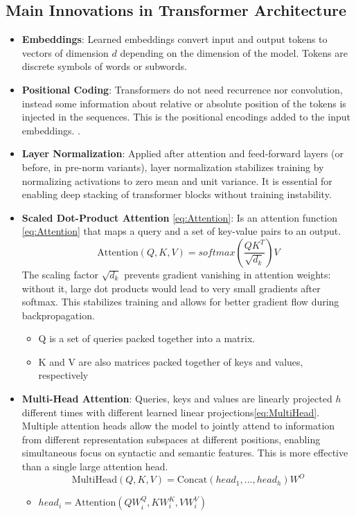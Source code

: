 \subsection{Main Innovations in Transformer Architecture}  
\begin{itemize}
    \item \textbf{Embeddings}: Learned embeddings convert input and output tokens to vectors of dimension $d$ depending on the dimension of the model. Tokens are discrete symbols of words or subwords.
    
    \item \textbf{Positional Coding}:  
    Transformers do not need recurrence nor convolution, instead some information about relative or absolute position of the tokens is injected in the sequences. This is the positional encodings added to the input embeddings. \cite{vaswani2017attention}.
    
    \item \textbf{Layer Normalization}: Applied after attention and feed-forward layers (or before, in pre-norm variants), layer normalization stabilizes training by normalizing activations to zero mean and unit variance. It is essential for enabling deep stacking of transformer blocks without training instability.  
    \item  \textbf{Scaled Dot-Product Attention} \ref{eq:Attention}: Is an attention function \ref{eq:Attention} that maps a query and a set of key-value pairs to an output.
    \begin{equation}
        \label{eq:Attention}
        \text{Attention}(Q,K,V) = softmax(\frac{QK^T}{\sqrt{d_k}})V 
    \end{equation}
    The scaling factor $\sqrt{d_k}$ prevents gradient vanishing in attention weights: without it, large dot products would lead to very small gradients after softmax. This stabilizes training and allows for better gradient flow during backpropagation.
    \begin{itemize}
        \item Q is a set of queries packed together into a matrix.
        \item K and V are also matrices packed together of keys and values, respectively
    \end{itemize}
    \item \textbf{Multi-Head Attention}:  Queries, keys and values are linearly projected $h$ different times with different learned linear projections\ref{eq:MultiHead}. Multiple attention heads allow the model to jointly attend to information from different representation subspaces at different positions, enabling simultaneous focus on syntactic and semantic features. This is more effective than a single large attention head.
    \begin{equation}
        \label{eq:MultiHead}
        \text{MultiHead}(Q,K,V) = \text{Concat}(head_1, ..., head_h)W^O  
    \end{equation}
    \begin{itemize}
        \item $head_i = \text{Attention}(QW_i^Q, KW_i^K,VW_i^V)$
    \end{itemize}
    

\end{itemize}
